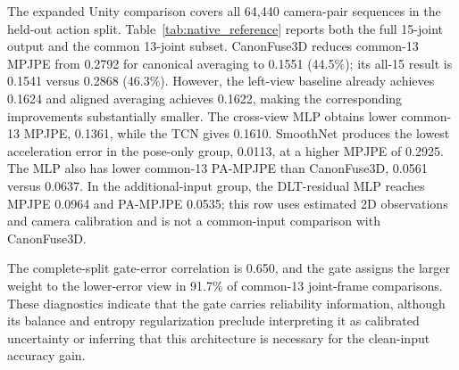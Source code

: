 \documentclass[preprint,12pt]{elsarticle}
\begin{document}
The expanded Unity comparison covers all 64,440 camera-pair sequences in the held-out action split. Table~\ref{tab:native_reference} reports both the full 15-joint output and the common 13-joint subset. CanonFuse3D reduces common-13 MPJPE from 0.2792 for canonical averaging to 0.1551 (44.5\%); its all-15 result is 0.1541 versus 0.2868 (46.3\%). However, the left-view baseline already achieves 0.1624 and aligned averaging achieves 0.1622, making the corresponding improvements substantially smaller. The cross-view MLP obtains lower common-13 MPJPE, 0.1361, while the TCN gives 0.1610. SmoothNet produces the lowest acceleration error in the pose-only group, 0.0113, at a higher MPJPE of 0.2925. The MLP also has lower common-13 PA-MPJPE than CanonFuse3D, 0.0561 versus 0.0637. In the additional-input group, the DLT-residual MLP reaches MPJPE 0.0964 and PA-MPJPE 0.0535; this row uses estimated 2D observations and camera calibration and is not a common-input comparison with CanonFuse3D.

The complete-split gate-error correlation is 0.650, and the gate assigns the larger weight to the lower-error view in 91.7\% of common-13 joint-frame comparisons. These diagnostics indicate that the gate carries reliability information, although its balance and entropy regularization preclude interpreting it as calibrated uncertainty or inferring that this architecture is necessary for the clean-input accuracy gain.
\end{document}
